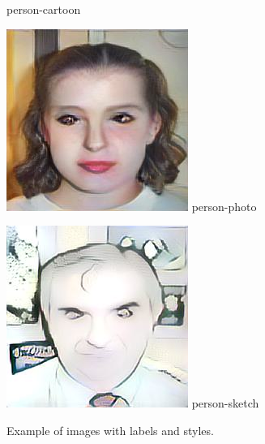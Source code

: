 \documentclass{article}
\begin{document}
\begin{figure}[htp]
\begin{minipage}{0.14285714285714285\linewidth}
        {person-cartoon}
    \end{minipage}%
    \begin{minipage}{0.14285714285714285\linewidth}
        \includegraphics[width=\linewidth]{./classify/derived-files/person_photo_0.jpg}
        {person-photo}
    \end{minipage}%
    \begin{minipage}{0.14285714285714285\linewidth}
        \includegraphics[width=\linewidth]{./classify/derived-files/person_sketch_0.jpg}
        {person-sketch}
    \end{minipage}%


\caption{Example of images with labels and styles.}
\label{fig:label_style}
\end{figure}
\end{document}
